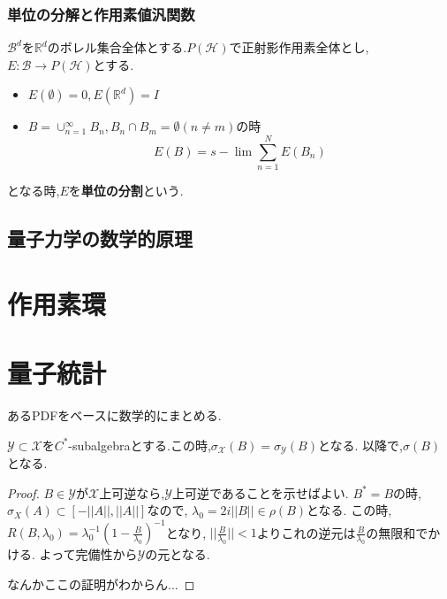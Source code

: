\documentclass[uplatex]{jsbook}
\begin{document}
\section{単位の分解と作用素値汎関数}
\begin{screen}
\begin{dfn}
$\mathcal{B}^d$を$\mathbb{R}^d$のボレル集合全体とする.$P(\mathcal{H})$で正射影作用素全体とし,
$E: \mathcal{B} \to P(\mathcal{H})$とする.
\begin{itemize}
  \item $E(\emptyset) = 0, E(\mathbb{R}^d) = I$
  \item $B = \cup_{n=1}^{\infty} B_n,B_n \cap B_m = \emptyset (n \neq m) $の時
  \begin{equation*}
  E(B) = s- \lim \sum_{n=1}^N E(B_n)
  \end{equation*}
\end{itemize}
となる時,$E$を\textbf{単位の分割}という.
\end{dfn}
\end{screen}

\chapter{量子力学の数学的原理}


\part{作用素環}

\part{量子統計}
あるPDFをベースに数学的にまとめる.

\begin{thm}
$\mathcal{Y} \subset \mathcal{X}$を$C^*$-subalgebraとする.この時,$\sigma_{\mathcal{X}}(B) = \sigma_{\mathcal{Y}}(B)$となる.
以降で,$\sigma(B)$となる.
\end{thm}
\begin{proof}
$B \in \mathcal{Y}$が$\mathcal{X}$上可逆なら,$\mathcal{Y}$上可逆であることを示せばよい.
$B^*=B$の時,$\sigma_X(A) \subset [-||A||, ||A||]$なので,
$\lambda_0 = 2i||B|| \in \rho(B)$となる.
この時,$R(B, \lambda_0) = \lambda_0^{-1}(1 - \frac{B}{\lambda_0})^{-1}$となり,
$||\frac{B}{\lambda_0}|| < 1$よりこれの逆元は$\frac{B}{\lambda_0}$の無限和でかける.
よって完備性から$\mathcal{Y}$の元となる.

なんかここの証明がわからん...
\end{proof}
\end{document}
